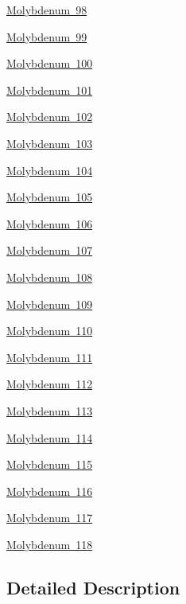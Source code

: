\begin{DoxyCompactItemize}
\item 
\mbox{\hyperlink{group___isotope_const-_molybdenum-_mo98}{Molybdenum 98}}
\item 
\mbox{\hyperlink{group___isotope_const-_molybdenum-_mo99}{Molybdenum 99}}
\item 
\mbox{\hyperlink{group___isotope_const-_molybdenum-_mo100}{Molybdenum 100}}
\item 
\mbox{\hyperlink{group___isotope_const-_molybdenum-_mo101}{Molybdenum 101}}
\item 
\mbox{\hyperlink{group___isotope_const-_molybdenum-_mo102}{Molybdenum 102}}
\item 
\mbox{\hyperlink{group___isotope_const-_molybdenum-_mo103}{Molybdenum 103}}
\item 
\mbox{\hyperlink{group___isotope_const-_molybdenum-_mo104}{Molybdenum 104}}
\item 
\mbox{\hyperlink{group___isotope_const-_molybdenum-_mo105}{Molybdenum 105}}
\item 
\mbox{\hyperlink{group___isotope_const-_molybdenum-_mo106}{Molybdenum 106}}
\item 
\mbox{\hyperlink{group___isotope_const-_molybdenum-_mo107}{Molybdenum 107}}
\item 
\mbox{\hyperlink{group___isotope_const-_molybdenum-_mo108}{Molybdenum 108}}
\item 
\mbox{\hyperlink{group___isotope_const-_molybdenum-_mo109}{Molybdenum 109}}
\item 
\mbox{\hyperlink{group___isotope_const-_molybdenum-_mo110}{Molybdenum 110}}
\item 
\mbox{\hyperlink{group___isotope_const-_molybdenum-_mo111}{Molybdenum 111}}
\item 
\mbox{\hyperlink{group___isotope_const-_molybdenum-_mo112}{Molybdenum 112}}
\item 
\mbox{\hyperlink{group___isotope_const-_molybdenum-_mo113}{Molybdenum 113}}
\item 
\mbox{\hyperlink{group___isotope_const-_molybdenum-_mo114}{Molybdenum 114}}
\item 
\mbox{\hyperlink{group___isotope_const-_molybdenum-_mo115}{Molybdenum 115}}
\item 
\mbox{\hyperlink{group___isotope_const-_molybdenum-_mo116}{Molybdenum 116}}
\item 
\mbox{\hyperlink{group___isotope_const-_molybdenum-_mo117}{Molybdenum 117}}
\item 
\mbox{\hyperlink{group___isotope_const-_molybdenum-_mo118}{Molybdenum 118}}
\end{DoxyCompactItemize}


\subsection{Detailed Description}
